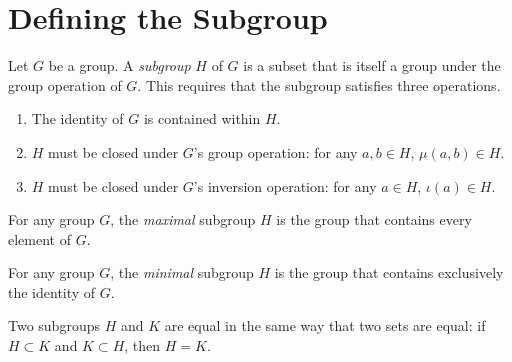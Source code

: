 \section{Defining the Subgroup}

\begin{definition}
    \label{definition : Subgroup}
    \leanok
    Let $G$ be a group. A \textit{subgroup} $H$ of $G$ is a subset that is itself a group under the group operation of $G$. This requires that the subgroup satisfies three operations.

    \begin{enumerate}
        \item The identity of $G$ is contained within $H$.
        \item $H$ must be closed under $G$'s group operation: for any $a,b \in H$, $\mu(a,b) \in H$.
        \item $H$ must be closed under $G$'s inversion operation: for any $a \in H$, $\iota(a) \in H$.
    \end{enumerate}
\end{definition}

\begin{definition}
    \label{definition : Subgroup_Maximal}
    \leanok
    For any group $G$, the \textit{maximal} subgroup $H$ is the group that contains every element of $G$.
\end{definition}

\begin{definition}
    \label{definition : Subgroup_Minimal}
    \leanok
    For any group $G$, the \textit{minimal} subgroup $H$ is the group that contains exclusively the identity of $G$.
\end{definition}

\begin{theorem}
    \label{theorem : Subgroup_ext}
    \leanok
    Two subgroups $H$ and $K$ are equal in the same way that two sets are equal: if $H \subset K$ and $K \subset H$, then $H = K$.
\end{theorem}


